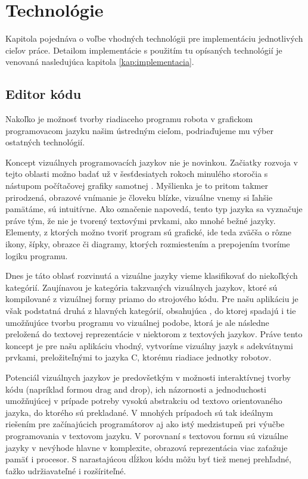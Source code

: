 \chapter{Technológie}
\label{kap:technologie}

Kapitola pojednáva o voľbe vhodných technológii pre implementáciu jednotlivých cieľov práce. Detailom implementácie s použitím tu opísaných technológií je venovaná nasledujúca kapitola \ref{kap:implementacia}.

\section{Editor kódu}
\label{kap:GrafickyProgramovaciJayzk}
Nakoľko je možnosť tvorby riadiaceho programu robota v grafickom programovacom jazyku našim ústredným cieľom, podriaďujeme mu výber ostatných technológií.

Koncept vizuálnych programovacích jazykov nie je novinkou. Začiatky rozvoja v tejto oblasti možno badať už v šesťdesiatych rokoch minulého storočia s nástupom počítačovej grafiky samotnej \cite{boshernitsan2004visual}. Myšlienka je to pritom takmer prirodzená, obrazové vnímanie je človeku blízke, vizuálne vnemy si ľahšie pamätáme, sú intuitívne. Ako označenie napovedá, tento typ jazyka sa vyznačuje práve tým, že nie je tvorený textovými prvkami, ako mnohé bežné jazyky. Elementy, z ktorých možno tvoriť program sú grafické, ide teda zväčša o rôzne ikony, šípky, obrazce či diagramy, ktorých rozmiestením a prepojením tvoríme logiku programu.

Dnes je táto oblasť rozvinutá a vizuálne jazyky vieme klasifikovať do niekoľkých kategórií. Zaujínavou je kategória takzvaných  vizuálnych jazykov, ktoré sú kompilované z vizuálnej formy priamo do strojového kódu. Pre našu aplikáciu je však podstatná druhá z hlavných kategórií, obsahujúca , do ktorej spadajú i tie umožňujúce tvorbu programu vo vizuálnej podobe, ktorá je ale následne preložená do textovej reprezentácie v niektorom z textových jazykov. Práve tento koncept je pre našu aplikáciu vhodný, vytvoríme vizuálny jazyk s adekvátnymi prvkami, preložiteľnými to jazyka C, ktorému  riadiace jednotky robotov.

Potenciál vizuálnych jazykov je predovšetkým v možnosti interaktívnej tvorby kódu (napríklad formou drag and drop), ich názornosti a jednoduchosti umožňujúcej v prípade potreby vysokú abstrakciu od textovo orientovaného jazyka, do ktorého sú prekladané. V mnohých prípadoch sú tak ideálnym riešením pre začínajúcich programátorov aj ako istý medzistupeň pri výučbe programovania v textovom jazyku. V porovnaní s textovou formu sú vizuálne jazyky v nevýhode hlavne v komplexite, obrazová reprezentácia viac zaťažuje pamäť i procesor. S narastajúcou dĺžkou kódu môžu byť tiež menej prehľadné, ťažko udržiavateľné i rozšíriteľné.

